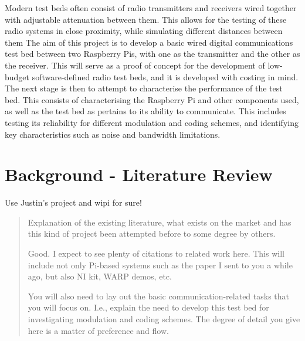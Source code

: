 \documentclass[../main.tex]{subfiles}
\begin{document}
Modern test beds often consist of radio transmitters and receivers wired together with adjustable attenuation between them.
This allows for the testing of these radio systems in close proximity, while simulating different distances between them \cite{https://www.jfwindustries.com/pdf/Understanding}%
The aim of this project is to develop a basic wired digital communications test bed between two Raspberry Pis, with one as the transmitter and the other as the receiver.
This will serve as a proof of concept for the development of low-budget software-defined radio test beds, and it is developed with costing in mind.
The next stage is then to attempt to characterise the performance of the test bed.
This consists of characterising the Raspberry Pi and other components used, as well as the test bed as pertains to its ability to communicate.
This includes testing its reliability for different modulation and coding schemes, and identifying key characteristics such as noise and bandwidth limitations.\\


\section{Background - Literature Review} \label{sec_Lit Review}

Use Justin's project and wipi for sure!

\begin{quotation}
	Explanation of the existing literature, what exists on the market and has this kind of project been attempted before to some degree by others.
	
	Good.  I expect to see plenty of citations to related work here.  This will include not only Pi-based systems such as the paper I sent to you a while ago, but also NI kit, WARP demos, etc.
	
	You will also need to lay out the basic communication-related tasks that you will focus on.  I.e., explain the need to develop this test bed for investigating modulation and coding schemes.  The degree of detail you give here is a matter of preference and flow.
\end{quotation}



\end{document}
